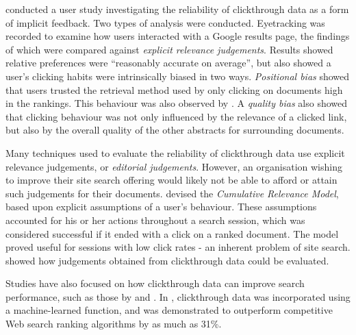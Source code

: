 \citeauthor{joachims2005clickthrough} \cite{joachims2005clickthrough} conducted a user study investigating the reliability of clickthrough data as a form of implicit feedback. Two types of analysis were conducted. Eyetracking was recorded to examine how users interacted with a Google results page, the findings of which were compared against \emph{explicit relevance judgements}. Results showed relative preferences were ``reasonably accurate on average'', but also showed a user's clicking habits were intrinsically biased in two ways. \emph{Positional bias} showed that users trusted the retrieval method used by only clicking on documents high in the rankings. This behaviour was also observed by \citeauthor{granka2004eyetracking} \cite{granka2004eyetracking}. A \emph{quality bias} also showed that clicking behaviour was not only influenced by the relevance of a clicked link, but also by the overall quality of the other abstracts for surrounding documents.

Many techniques used to evaluate the reliability of clickthrough data use explicit relevance judgements, or \emph{editorial judgements}. However, an organisation wishing to improve their site search offering would likely not be able to afford or attain such judgements for their documents. \citeauthor{dupret2010intrinsic_document_relevance_clickthrough_logs} \cite{dupret2010intrinsic_document_relevance_clickthrough_logs} devised the \emph{Cumulative Relevance Model}, based upon explicit assumptions of a user's behaviour. These assumptions accounted for his or her actions throughout a search session, which was considered successful if it ended with a click on a ranked document. The model proved useful for sessions with low click rates - an inherent problem of site search. \citeauthor{hofmann2011graded_relevance} \cite{hofmann2011graded_relevance} showed how judgements obtained from clickthrough data could be evaluated.

Studies have also focused on how clickthrough data can improve search performance, such as those by \citeauthor{agichtein2006improving_web_search} \cite{agichtein2006improving_web_search} and \citeauthor{xue2003web_logs_site_search} \cite{xue2003web_logs_site_search}. In \cite{agichtein2006improving_web_search}, clickthrough data was incorporated using a machine-learned function, and was demonstrated to outperform competitive Web search ranking algorithms by as much as 31\%.